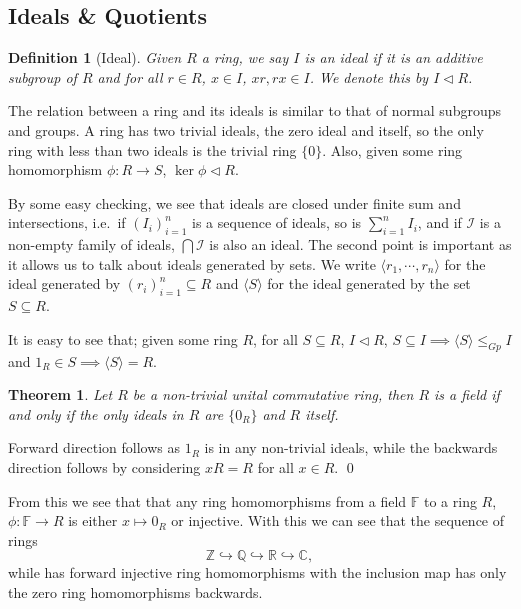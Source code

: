 \documentclass[
]{article}
\newtheorem{theorem}{Theorem}
\newtheorem{definition}{Definition}[theorem]
\begin{document}
\hypertarget{ideals-quotients}{%
\subsection{Ideals \& Quotients}\label{ideals-quotients}}

\begin{definition}[Ideal]
  Given \(R\) a ring, we say \(I\) is an ideal if it is an additive subgroup of 
  \(R\) and for all \(r \in R\), \(x \in I\), \(xr, rx \in I\). We denote this 
  by \(I \triangleleft R\).
\end{definition}

The relation between a ring and its ideals is similar to that of normal
subgroups and groups. A ring has two trivial ideals, the zero ideal and
itself, so the only ring with less than two ideals is the trivial ring
\(\{0\}\). Also, given some ring homomorphism \(\phi : R \to S\),
\(\ker \phi \triangleleft R\).

By some easy checking, we see that ideals are closed under finite sum
and intersections, i.e.~if \((I_i)_{i = 1}^n\) is a sequence of ideals,
so is \(\sum_{i = 1}^n I_i\), and if \(\mathcal{I}\) is a non-empty
family of ideals, \(\bigcap \mathcal{I}\) is also an ideal. The second
point is important as it allows us to talk about ideals generated by
sets. We write \(\langle r_1, \cdots, r_n \rangle\) for the ideal
generated by \((r_i)_{i = 1}^n \subseteq R\) and \(\langle S \rangle\)
for the ideal generated by the set \(S \subseteq R\).

It is easy to see that; given some ring \(R\), for all
\(S \subseteq R\), \(I \triangleleft R\),
\(S \subseteq I \implies \langle S \rangle \le_{Gp} I\) and
\(1_R \in S \implies \langle S \rangle = R\).

\begin{theorem}
  Let \(R\) be a non-trivial unital commutative ring, then \(R\) is a field if 
  and only if the only ideals in \(R\) are \(\{0_R\}\) and \(R\) itself.
\end{theorem}
\proof

Forward direction follows as \(1_R\) is in any non-trivial ideals, while
the backwards direction follows by considering \(xR = R\) for all
\(x \in R\). \qed

From this we see that that any ring homomorphisms from a field
\(\mathbb{F}\) to a ring \(R\), \(\phi : \mathbb{F} \to R\) is either
\(x \mapsto 0_R\) or injective. With this we can see that the sequence
of rings \[
  \mathbb{Z} \hookrightarrow \mathbb{Q} \hookrightarrow \mathbb{R} 
  \hookrightarrow \mathbb{C},
\] while has forward injective ring homomorphisms with the inclusion map
has only the zero ring homomorphisms backwards.
\end{document}
